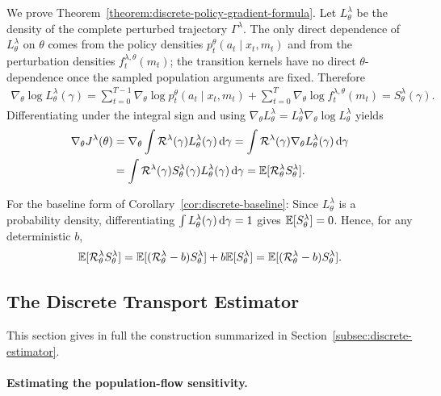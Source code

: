 We prove Theorem~\ref{theorem:discrete-policy-gradient-formula}.
Let $L_\theta^\lambda$ be the density of the complete perturbed trajectory $\Gamma^\lambda$. The only direct dependence of $L_\theta^\lambda$ on $\theta$ comes from the policy densities $p_t^\theta(a_t\mid x_t,m_t)$ and from the perturbation densities $f_t^{\lambda,\theta}(m_t)$; the transition kernels have no direct $\theta$-dependence once the sampled population arguments are fixed. Therefore
\begin{align}
    \nabla_\theta\log L_\theta^\lambda(\gamma)
    =
    \sum_{t=0}^{T-1}\nabla_\theta\log p_t^\theta(a_t\mid x_t,m_t)
    +
    \sum_{t=0}^T\nabla_\theta\log f_t^{\lambda,\theta}(m_t)
    =
    S_\theta^\lambda(\gamma).
\end{align}
Differentiating under the integral sign and using $\nabla_\theta L_\theta^\lambda=L_\theta^\lambda\nabla_\theta\log L_\theta^\lambda$ yields
\begin{align}
    \nabla_\theta J^\lambda(\theta)
    &=
    \nabla_\theta\int {\cal R}^\lambda(\gamma)L_\theta^\lambda(\gamma)\,\mathrm{d}\gamma
    =
    \int {\cal R}^\lambda(\gamma)\nabla_\theta L_\theta^\lambda(\gamma)\,\mathrm{d}\gamma\\
    &=
    \int {\cal R}^\lambda(\gamma)S_\theta^\lambda(\gamma)L_\theta^\lambda(\gamma)\,\mathrm{d}\gamma
    =
    \mathbb{E}[{\cal R}_\theta^\lambda S_\theta^\lambda].
\end{align}

For the baseline form of Corollary~\ref{cor:discrete-baseline}:
Since $L_\theta^\lambda$ is a probability density, differentiating $\int L_\theta^\lambda(\gamma)\,\mathrm{d}\gamma=1$ gives $\mathbb{E}[S_\theta^\lambda]=0$. Hence, for any deterministic $b$,
\begin{align}
    \mathbb{E}[{\cal R}^\lambda_\theta S^\lambda_\theta]
    =
    \mathbb{E}[({\cal R}^\lambda_\theta-b)S^\lambda_\theta]+b\mathbb{E}[S^\lambda_\theta]
    =
    \mathbb{E}[({\cal R}^\lambda_\theta-b)S^\lambda_\theta].
\end{align}

\subsection{The Discrete Transport Estimator}
\label{appendix:discrete-estimator}

This section gives in full the construction summarized in Section~\ref{subsec:discrete-estimator}.

\paragraph{Estimating the population-flow sensitivity.}

